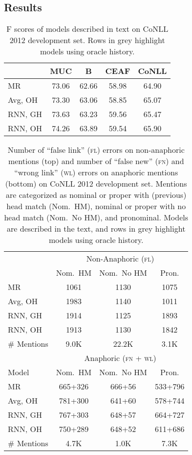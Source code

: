 \documentclass[11pt,letterpaper]{article}
\begin{document}
\subsection{Results}
\newcommand{\fix}[1]{{\color{white}1}#1}
\newcommand{\fixg}[1]{{\color{Gray}1}#1}
\begin{table}[t!]
\centering
\small
\begin{tabular}{lcccc}
\toprule 
 & MUC & B & CEAF & CoNLL \\ 
\midrule 
MR          & 73.06 & 62.66 & 58.98 & 64.90 \\
\rowcolor{Gray}
Avg, OH    & 73.30 & 63.06 & 58.85 & 65.07 \\
RNN, GH & 73.63 & 63.23 & 59.56 & 65.47 \\
\rowcolor{Gray}
RNN, OH  & 74.26 & 63.89 & 59.54 & 65.90 \\
\bottomrule 
\end{tabular} 
\caption{F scores of models described in text on CoNLL 2012 development set. Rows in grey highlight models using oracle history.}
\label{tab:conlldev}
\end{table}
\begin{table}[t!]
\small
\begin{tabular}{lccc}
 \toprule 
 & \multicolumn{3}{c}{Non-Anaphoric (\textsc{fl})} \\
  & Nom.~HM & Nom.~No HM & Pron. \\
 \midrule
MR  & {1061} & \fix{130} & {1075} \\
\rowcolor{Gray}
Avg, OH  & \fixg{983} & \fixg{140} & {1011}\\
RNN, GH  & \fix{914} & \fix{125} & \fix{893}\\
\rowcolor{Gray}
RNN, OH  & \fixg{913} & \fixg{130} & \fixg{842}\\
\midrule
\# Mentions & 9.0K  & 22.2K & 3.1K \\
\toprule
& \multicolumn{3}{c}{Anaphoric (\textsc{fn} + \textsc{wl})} \\
 Model & Nom.~HM & Nom.~No HM & Pron. \\
 \midrule
MR  & 665+326 & 666+56 & 533+796 \\
\rowcolor{Gray}
Avg, OH  & 781+300 & 641+60 & 578+744\\
RNN, GH  & 767+303 & 648+57 & 664+727 \\
\rowcolor{Gray}
RNN, OH  & 750+289 & 648+52 & 611+686 \\
\midrule
\# Mentions & 4.7K  & 1.0K & 7.3K \\
 \bottomrule
\end{tabular} 
\caption{Number of ``false link'' (\textsc{fl}) errors on non-anaphoric mentions (top) and number of ``false new'' (\textsc{fn}) and ``wrong link'' (\textsc{wl}) errors on anaphoric mentions (bottom) on CoNLL 2012 development set. Mentions are categorized as nominal or proper with (previous) head match (Nom.~HM), nominal or proper with no head match (Nom.~No HM), and pronominal. Models are described in the text, and rows in grey highlight models using oracle history.}
\label{tab:newerrors}
\end{table}
\end{document}
